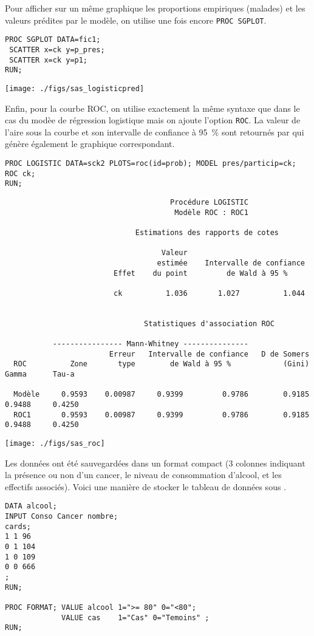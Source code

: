 
Pour afficher sur un même graphique les proportions empiriques (malades) et
les valeurs prédites par le modèle, on utilise une fois encore \texttt{PROC SGPLOT}.
\begin{verbatim}
PROC SGPLOT DATA=fic1;
 SCATTER x=ck y=p_pres;
 SCATTER x=ck y=p1;
RUN;
\end{verbatim}

\texttt{[image: ./figs/sas\_logisticpred]}

Enfin, pour la courbe ROC, on utilise exactement la même syntaxe que dans le
cas du modèe de régression logistique mais on ajoute l'option
\texttt{ROC}. La valeur de l'aire sous la courbe et son intervalle de
confiance à 95~\% sont retournés par \SAS qui génère également le graphique
correspondant.
\begin{verbatim}
PROC LOGISTIC DATA=sck2 PLOTS=roc(id=prob); MODEL pres/particip=ck;
ROC ck;
RUN;
\end{verbatim}

\begin{verbatim}
                                      Procédure LOGISTIC
                                       Modèle ROC : ROC1

                              Estimations des rapports de cotes

                                    Valeur
                                   estimée    Intervalle de confiance
                         Effet    du point         de Wald à 95 %

                         ck          1.036       1.027          1.044


                                Statistiques d'association ROC

           ---------------- Mann-Whitney ---------------
                        Erreur   Intervalle de confiance   D de Somers
  ROC          Zone       type        de Wald à 95 %            (Gini)      Gamma      Tau-a

  Modèle     0.9593    0.00987     0.9399         0.9786        0.9185     0.9488     0.4250
  ROC1       0.9593    0.00987     0.9399         0.9786        0.9185     0.9488     0.4250
\end{verbatim}

\texttt{[image: ./figs/sas\_roc]}

\soln{\ref{exo:10.6}} Les données ont été sauvegardées dans un format
compact (3 colonnes indiquant la présence ou non d'un cancer, le niveau de
consommation d'alcool, et les effectifs associés). Voici une manière de
stocker le tableau de données sous \SAS.
\begin{verbatim}
DATA alcool;
INPUT Conso Cancer nombre;
cards;
1 1 96
0 1 104
1 0 109
0 0 666
;
RUN;

PROC FORMAT; VALUE alcool 1=">= 80" 0="<80";
             VALUE cas    1="Cas" 0="Temoins" ;
RUN;
\end{verbatim}

